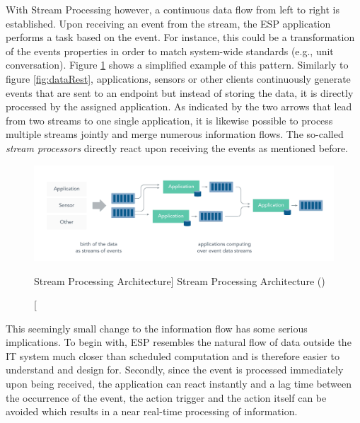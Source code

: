 With Stream Processing however, a continuous data flow from left to right is established. Upon receiving an event from the stream, the \acf{ESP} application performs a task based on the event. For instance, this could be a transformation of the events properties in order to match system-wide standards (e.g., unit conversation). 
Figure \ref{fig:dataStream} shows a simplified example of this pattern. Similarly to figure \ref{fig:dataRest}, applications, sensors or other clients continuously generate events that are sent to an endpoint but instead of storing the data, it is directly processed by the assigned application. As indicated by the two arrows that lead from two streams to one single application, it is likewise possible to process multiple streams jointly and merge numerous information flows. The so-called \textit{stream processors} directly react upon receiving the events as mentioned before. 

\begin{figure}[ht]
    \includegraphics[width=\linewidth]{images/streaming/streming_data.png}\centering
    \caption
    [Stream Processing Architecture]
    {Stream Processing Architecture (\cite{dataArtisans2017WhatProcessing})}
    \label{fig:dataStream}
\end{figure}

This seemingly small change to the information flow has some serious implications. To begin with, \acf{ESP} resembles the natural flow of data outside the IT system much closer than scheduled computation and is therefore easier to understand and design for. Secondly, since the event is processed immediately upon being received, the application can react instantly and a lag time between the occurrence of the event, the action trigger and the action itself can be avoided which results in a near real-time processing of information. 

